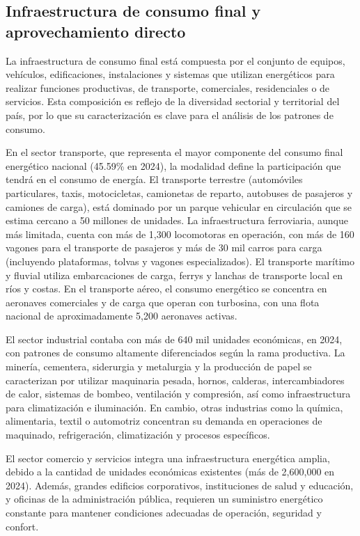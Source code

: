 \documentclass{sener2025}
\begin{document}
\subsection{Infraestructura de consumo final y aprovechamiento directo}

La infraestructura de consumo final está compuesta por el conjunto de equipos, vehículos, edificaciones, instalaciones y sistemas que utilizan energéticos para realizar funciones productivas, de transporte, comerciales, residenciales o de servicios. Esta composición es reflejo de la diversidad sectorial y territorial del país, por lo que su caracterización es clave para el análisis de los patrones de consumo.

En el sector transporte, que representa el mayor componente del consumo final energético nacional (45.59\% en 2024), la modalidad define la participación que tendrá en el consumo de energía. El transporte terrestre (automóviles particulares, taxis, motocicletas, camionetas de reparto, autobuses de pasajeros y camiones de carga), está dominado por un parque vehicular en circulación que se estima cercano a 50 millones de unidades. La infraestructura ferroviaria, aunque más limitada, cuenta con más de 1,300 locomotoras en operación, con más de 160 vagones para el transporte de pasajeros y más de 30 mil carros para carga (incluyendo plataformas, tolvas y vagones especializados). El transporte marítimo y fluvial utiliza embarcaciones de carga, ferrys y lanchas de transporte local en ríos y costas. En el transporte aéreo, el consumo energético se concentra en aeronaves comerciales y de carga que operan con turbosina, con una flota nacional de aproximadamente 5,200 aeronaves activas.

El sector industrial contaba con más de 640 mil unidades económicas, en 2024, con patrones de consumo altamente diferenciados según la rama productiva. La minería, cementera, siderurgia y metalurgia y la producción de papel se caracterizan por utilizar maquinaria pesada, hornos, calderas, intercambiadores de calor, sistemas de bombeo, ventilación y compresión, así como infraestructura para climatización e iluminación. En cambio, otras industrias como la química, alimentaria, textil o automotriz concentran su demanda en operaciones de maquinado, refrigeración, climatización y procesos específicos.

El sector comercio y servicios integra una infraestructura energética amplia, debido a la cantidad de unidades económicas existentes (más de 2,600,000 en 2024). Además, grandes edificios corporativos, instituciones de salud y educación, y oficinas de la administración pública, requieren un suministro energético constante para mantener condiciones adecuadas de operación, seguridad y confort.
\end{document}
